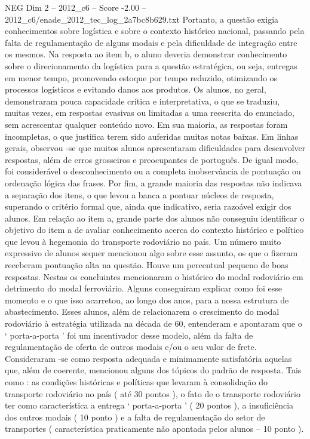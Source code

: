 \begin{textsample}{NEG Dim 2 – 2012\_c6 – Score -2.00 – 2012\_c6/enade\_2012\_tec\_log\_2a7bc8b629.txt}
Portanto, a questão exigia conhecimentos sobre logística e sobre o contexto histórico nacional, passando pela falta de regulamentação de alguns modais e pela dificuldade de integração entre os mesmos.
Na resposta ao item b, o aluno deveria demonstrar conhecimento sobre o direcionamento da logística para a questão estratégica, ou seja, entregas em menor tempo, promovendo estoque por tempo reduzido, otimizando os processos logísticos e evitando danos aos produtos.
Os alunos, no geral, demonstraram pouca capacidade crítica e interpretativa, o que se traduziu, muitas vezes, em respostas evasivas ou limitadas a uma reescrita do enunciado, sem acrescentar qualquer conteúdo novo.
Em sua maioria, as respostas foram incompletas, o que justifica terem sido auferidas muitas notas baixas.
Em linhas gerais, observou -se que muitos alunos apresentaram dificuldades para desenvolver respostas, além de erros grosseiros e preocupantes de português.
De igual modo, foi considerável o desconhecimento ou a completa inobservância de pontuação ou ordenação lógica das frases.
Por fim, a grande maioria das respostas não indicava a separação dos itens, o que levou a banca a pontuar núcleos de resposta, superando o critério formal que, ainda que indicativo, seria razoável exigir dos alunos.
Em relação ao item a, grande parte dos alunos não conseguiu identificar o objetivo do item a de avaliar conhecimento acerca do contexto histórico e político que levou à hegemonia do transporte rodoviário no país.
Um número muito expressivo de alunos sequer mencionou algo sobre esse assunto, os que o fizeram receberam pontuação alta na questão.
Houve um percentual pequeno de boas respostas.
Nestas os concluintes mencionaram o histórico do modal rodoviário em detrimento do modal ferroviário.
Alguns conseguiram explicar como foi esse momento e o que isso acarretou, ao longo dos anos, para a nossa estrutura de abastecimento.
Esses alunos, além de relacionarem o crescimento do modal rodoviário à estratégia utilizada na década de 60, entenderam e apontaram que o ‘ porta-a-porta ’ foi um incentivador desse modelo, além da falta de regulamentação de oferta de outros modais e/ou o seu valor de frete.
Consideraram -se como resposta adequada e minimamente satisfatória aquelas que, além de coerente, mencionou alguns dos tópicos do padrão de resposta.
Tais como : as condições históricas e políticas que levaram à consolidação do transporte rodoviário no país ( até 30 pontos ), o fato de o transporte rodoviário ter como característica a entrega ‘ porta-a-porta ’ ( 20 pontos ), a insuficiência dos outros modais ( 10 ponto ) e a falta de regulamentação do setor de transportes ( característica praticamente não apontada pelos alunos – 10 ponto ).

\end{textsample}
